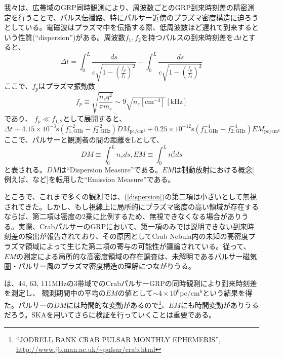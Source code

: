 我々は、広帯域のGRP同時観測により、周波数ごとのGRP到来時刻差の精密測定を行うことで、パルス伝播路、特にパルサー近傍のプラズマ密度構造に迫ろうとしている。電磁波はプラズマ中を伝播する際、低周波数ほど遅れて到来するという性質(``dispersion'')がある。周波数$f_1, f_2$を持つパルスの到来時刻差を$\Delta t$とすると\cite{LK04}、
\begin{equation}
\label{dispersion}
\Delta t = \int_{0}^{L}\frac{ds}{c\sqrt{1-\left(\frac{f_{p}}{f_{1}}\right)^{2}}} - \int_{0}^{L}\frac{ds}{c\sqrt{1-\left(\frac{f_{p}}{f_{2}}\right)^{2}}} 
\end{equation}
ここで、$f_p$はプラズマ振動数
\begin{equation}
\label{fpe}
f_{p} \equiv \sqrt{\frac{n_{e}q^{2}}{\pi m_{e}}} \sim 9\sqrt{n_{e}[\mathrm{cm}^{-3}]} [\mathrm{kHz}]
\end{equation}
であり、
$f_p \ll f_{1,2}$として展開すると、
\begin{equation}
\label{dispersion}
\Delta t\sim 4.15 \times 10^{-3} \mathrm{s} \left(f_{1,\mathrm{GHz}}^{-2}-f_{2,\mathrm{GHz}}^{-2}\right)DM_{\mathrm{pc/cm^{3}}}
+ 0.25 \times 10^{-12} \mathrm{s} \left(f_{1,\mathrm{GHz}}^{-4}-f_{2,\mathrm{GHz}}^{-4}\right)EM_{\mathrm{pc/cm^{6}}} 
\end{equation}
ここで、パルサーと観測者の間の距離をLとして、
\begin{equation}
DM\equiv \int_{0}^{L}n_{e} ds,　　EM\equiv \int_{0}^{L}n_{e}^{2} ds
\end{equation}
と表される。$DM$は``Dispersion Measure''である。$EM$は制動放射における概念$[$例えば、\cite{Nakai08}など$]$を転用した``Emission Measure''である。

ところで、これまで多くの観測では、(\ref{dispersion})の第二項は小さいとして無視されてきた。しかし、もし視線上に局所的にプラズマ密度の高い領域が存在するならば、第二項は密度の2乗に比例するため、無視できなくなる場合がありうる。実際、CrabパルサーのGRPにおいて、第一項のみでは説明できない到来時刻差の検出が報告されており\cite{Ku08}、その原因としてCrab Nebula内の未知の高密度プラズマ領域によって生じた第二項の寄与の可能性が議論されている。従って、$EM$の測定による局所的な高密度領域の存在調査は、未解明であるパルサー磁気圏・パルサー風のプラズマ密度構造の理解につながりうる。

\cite{Ku08}は、44, 63, 111MHzの3帯域でのCrabパルサーGRPの同時観測により到来時刻差を測定し、 観測期間中の平均の$EM$の値として$\sim4\times10^{6}$pc/cm$^{6}$という結果を得た。パルサーの$DM$には時間的な変動がある\citep{Ly93}ので\footnote{``JODRELL BANK CRAB PULSAR MONTHLY EPHEMERIS'', \url{http://www.jb.man.ac.uk/~pulsar/crab.html}}、$EM$にも時間変動がありうるだろう。SKAを用いてさらに検証を行っていくことは重要である。

